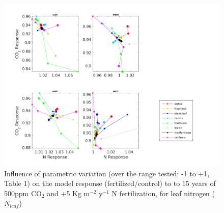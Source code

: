 \documentclass[draft,linenumbers]{agujournal}
\begin{document}
  \begin{figure}[h]
     \includegraphics[width=1.2\textwidth]{matlab/figures/MAY19jp_at_relCNdep_defpft_LEAFN_y2013.png}
     \caption{Influence of parametric variation (over the range tested: -1 to +1, Table 1) on the model response (fertilized/control) to to 15 years of 500ppm CO$_{2}$ and +5 Kg m$^{-2}$ y$^{-1}$ N fertilization, for leaf nitrogen ($N_{leaf}$)}
     \label{CN_LEAFN}
  \end{figure}
 
 
\end{document}
